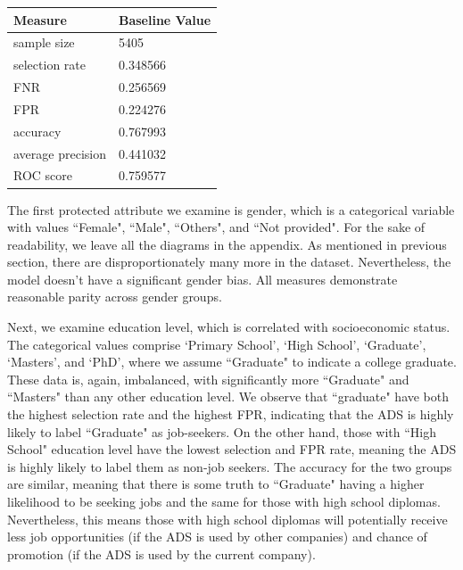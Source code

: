 \begin{table}[h]
\centering
\begin{tabular}{ |p{3cm}||p{3cm}|}
 \hline
 Measure 		& Baseline Value\\
 \hline

sample size 	& 5405 \\

selection rate 	& 0.348566 \\

FNR 	& 0.256569\\

FPR & 0.224276 \\

accuracy		 & 0.767993 \\
average precision & 0.441032 \\
ROC score & 0.759577 \\

 \hline
\end{tabular}
\end{table}


The first protected attribute we examine is gender, which is a categorical variable with values ``Female", ``Male", ``Others", and ``Not provided". For the sake of readability, we leave all the diagrams in the appendix. As mentioned in previous section, there are disproportionately many more in the dataset. Nevertheless, the model doesn't have a significant gender bias. All measures demonstrate reasonable parity across gender groups.

Next, we examine education level, which is correlated with socioeconomic status. The categorical values comprise `Primary School', `High School', `Graduate', `Masters', and `PhD', where we assume ``Graduate" to indicate a college graduate. These data is, again, imbalanced, with significantly more ``Graduate" and ``Masters" than any other education level. We observe that ``graduate" have both the highest selection rate and the highest FPR, indicating that the ADS is highly likely to label ``Graduate" as job-seekers. On the other hand, those with ``High School" education level have the lowest selection and FPR rate, meaning the ADS is highly likely to label them as non-job seekers. The accuracy for the two groups are similar, meaning that there is some truth to ``Graduate" having a higher likelihood to be seeking jobs and the same for those with high school diplomas. Nevertheless, this means those with high school diplomas will potentially receive less job opportunities (if the ADS is used by other companies) and chance of promotion (if the ADS is used by the current company).

